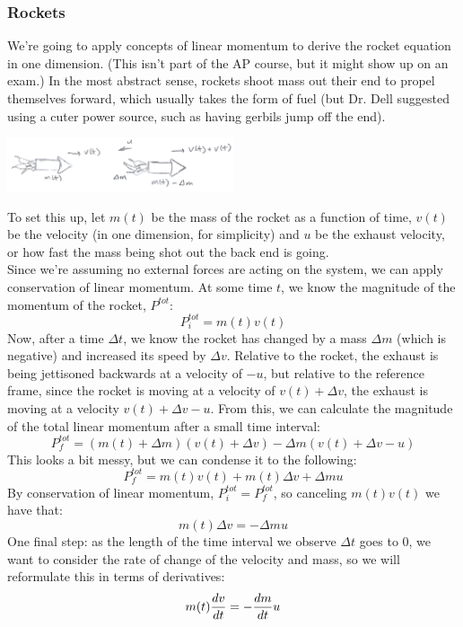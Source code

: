 \subsubsection{Rockets}
We're going to apply concepts of linear momentum to derive the rocket equation in one dimension. (This isn't part of the AP course, but it might show up on an exam.) In the most abstract sense, rockets shoot mass out their end to propel themselves forward, which usually takes the form of fuel (but Dr. Dell suggested using a cuter power source, such as having gerbils jump off the end).\\
\begin{center}
	\includegraphics[width=0.5\textwidth]{images/mechintro/rockets.png}\\
\end{center}
To set this up, let $m(t)$ be the mass of the rocket as a function of time, $v(t)$ be the velocity (in one dimension, for simplicity) and $u$ be the exhaust velocity, or how fast the mass being shot out the back end is going. \\
Since we're assuming no external forces are acting on the system, we can apply conservation of linear momentum. At some time $t$, we know the magnitude of the momentum of the rocket, $P^{tot}$:
\[
	P^{tot}_i = m(t) v(t) 
\]
Now, after a time $\Delta t$, we know the rocket has changed by a mass $\Delta m$ (which is negative) and increased its speed by $\Delta v$. Relative to the rocket, the exhaust is being jettisoned backwards at a velocity of $-u$, but relative to the reference frame, since the rocket is moving at a velocity of $v(t) + \Delta v$, the exhaust is moving at a velocity $v(t) + \Delta v - u$. From this, we can calculate the magnitude of the total linear momentum after a small time interval:
\[
	P^{tot}_f = (m(t) + \Delta m)(v(t) + \Delta v) - \Delta m (v(t) + \Delta v - u)
\]
This looks a bit messy, but we can condense it to the following: 
\[
	P^{tot}_f = m(t)v(t) + m(t) \Delta v + \Delta m u 
\]
By conservation of linear momentum, $P^{tot}_i = P^{tot}_f$, so canceling $m(t)v(t)$ we have that:
\[
	m(t) \Delta v = - \Delta m u
\]
One final step: as the length of the time interval we observe $\Delta t$ goes to $0$, we want to consider the rate of change of the velocity and mass, so we will reformulate this in terms of derivatives:
\[
	m(t) \frac{d v}{d t} = - \frac{d m}{d t} u
\]
